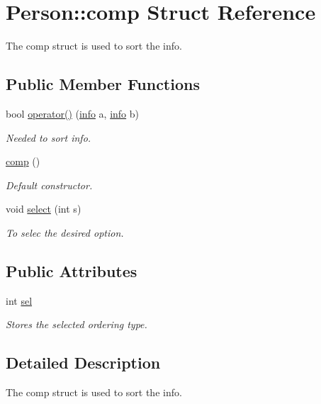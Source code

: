 \hypertarget{struct_person_1_1comp}{\section{Person\+:\+:comp Struct Reference}
\label{struct_person_1_1comp}
}


The comp struct is used to sort the info.  


\subsection*{Public Member Functions}
\begin{DoxyCompactItemize}
\item 
bool \hyperlink{struct_person_1_1comp_a99053054fa60fef569df526d680b9993}{operator()} (\hyperlink{struct_person_1_1info}{info} a, \hyperlink{struct_person_1_1info}{info} b)
\begin{DoxyCompactList}\small\item\em Needed to sort info. \end{DoxyCompactList}\item 
\hyperlink{struct_person_1_1comp_a5272710b2721399c612bcdad1b1cead7}{comp} ()
\begin{DoxyCompactList}\small\item\em Default constructor. \end{DoxyCompactList}\item 
void \hyperlink{struct_person_1_1comp_af552a34297c810b79725508e2d5d810a}{select} (int s)
\begin{DoxyCompactList}\small\item\em To selec the desired option. \end{DoxyCompactList}\end{DoxyCompactItemize}
\subsection*{Public Attributes}
\begin{DoxyCompactItemize}
\item 
int \hyperlink{struct_person_1_1comp_a85555416f9f001302f50825aa149ced3}{sel}
\begin{DoxyCompactList}\small\item\em Stores the selected ordering type. \end{DoxyCompactList}\end{DoxyCompactItemize}


\subsection{Detailed Description}
The comp struct is used to sort the info. 


